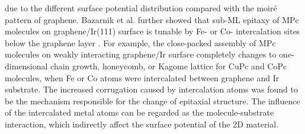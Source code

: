 due to the different surface potential distribution compared with the
moiré pattern of graphene. Bazarnik et al. further showed that sub-ML
epitaxy of MPc molecules on graphene/Ir(111) surface is tunable by Fe-
or Co- intercalation sites below the graphene layer
\cite{Bazarnik_2013_tailor_Fe_Co_gr_Ir,Avvisati_2017_FePc_intercal}. For
example, the close-packed assembly of MPc molecules on weakly
interacting graphene/Ir surface completely changes to one-dimensional
chain growth, honeycomb, or Kagome lattice for CuPc and CoPc
molecules, when Fe or Co atoms were intercalated between graphene and
Ir substrate. The increased corrugation caused by intercalation atoms
was found to be the mechanism responsible for the change of epitaxial
structure. The influence of the intercalated metal atoms can be
regarded as the molecule-substrate interaction, which indirectly
affect the surface potential of the 2D material.



